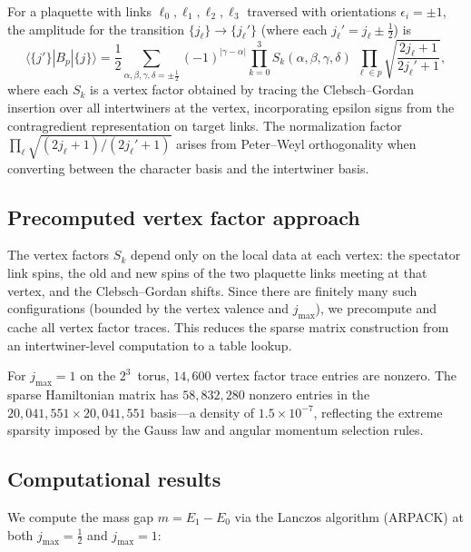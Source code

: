 \documentclass[12pt,a4paper]{article}
\newcommand{\half}{\tfrac{1}{2}}
\begin{document}
For a plaquette with links $\ell_0,\ell_1,\ell_2,\ell_3$ traversed with orientations $\epsilon_i=\pm 1$, the amplitude for the transition $\{j_\ell\}\to\{j_\ell'\}$ (where each $j_\ell'=j_\ell\pm\half$) is
\begin{equation}
\langle\{j'\}|B_p|\{j\}\rangle = \frac{1}{2}\sum_{\alpha,\beta,\gamma,\delta=\pm\half} (-1)^{|\gamma-\alpha|} \prod_{k=0}^{3} S_k(\alpha,\beta,\gamma,\delta)\;\prod_{\ell\in p}\sqrt{\frac{2j_\ell+1}{2j_\ell'+1}},
\end{equation}
where each $S_k$ is a vertex factor obtained by tracing the Clebsch--Gordan insertion over all intertwiners at the vertex, incorporating epsilon signs from the contragredient representation on target links. The normalization factor $\prod_\ell\sqrt{(2j_\ell+1)/(2j_\ell'+1)}$ arises from Peter--Weyl orthogonality when converting between the character basis and the intertwiner basis.

\subsection{Precomputed vertex factor approach}

The vertex factors $S_k$ depend only on the local data at each vertex: the spectator link spins, the old and new spins of the two plaquette links meeting at that vertex, and the Clebsch--Gordan shifts. Since there are finitely many such configurations (bounded by the vertex valence and $j_{\max}$), we precompute and cache all vertex factor traces. This reduces the sparse matrix construction from an intertwiner-level computation to a table lookup.

For $j_{\max}=1$ on the $2^3$~torus, $14{,}600$ vertex factor trace entries are nonzero. The sparse Hamiltonian matrix has $58{,}832{,}280$ nonzero entries in the $20{,}041{,}551\times 20{,}041{,}551$ basis---a density of $1.5\times 10^{-7}$, reflecting the extreme sparsity imposed by the Gauss law and angular momentum selection rules.

\subsection{Computational results}

We compute the mass gap $m=E_1-E_0$ via the Lanczos algorithm (ARPACK) at both $j_{\max}=\half$ and $j_{\max}=1$:
\end{document}
